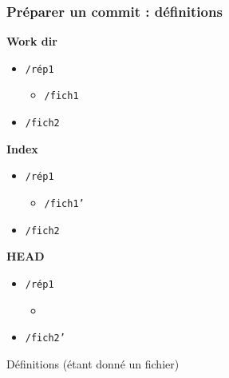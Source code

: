 \documentclass[english, french]{beamer}
\begin{document}
\begin{frame}
	\frametitle{Préparer un commit : définitions}
	\begin{minipage}[t]{0.33 \columnwidth}
		\textbf{Work dir}
		\begin{itemize}
			\item[] \texttt{/rép1}
			\begin{itemize}
				\item[] \texttt{/fich1}
			\end{itemize}\vspace{-0.8ex}
			\item[] \texttt{/fich2}
		\end{itemize}
	\end{minipage}%
	\begin{minipage}[t]{0.33 \columnwidth}
		\textbf{Index}
		\begin{itemize}
			\item[] \texttt{/rép1}
			\begin{itemize}
				\item[] \texttt{/fich1'}
			\end{itemize}\vspace{-0.8ex}
			\item[] \texttt{/fich2}
		\end{itemize}
	\end{minipage}%
	\begin{minipage}[t]{0.33 \columnwidth}
		\textbf{HEAD}
		\begin{itemize}
			\item[] \texttt{/rép1}
			\begin{itemize}
				\item[] %
			\end{itemize}\vspace{-0.8ex}
			\item[] \texttt{/fich2'}
		\end{itemize}
	\end{minipage}
	\begin{block}{Définitions (étant donné un fichier)}
		\begin{description}

\end{description}
\end{block}
\end{frame}
\end{document}

